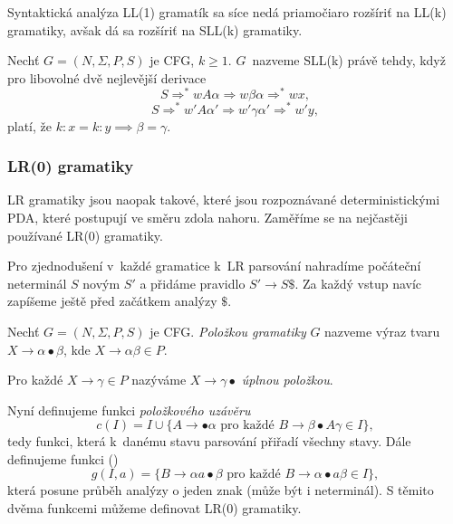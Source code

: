 Syntaktická analýza LL(1) gramatík sa síce nedá priamočiaro
rozšíriť na LL(k) gramatiky, avšak dá sa rozšíriť na SLL(k) gramatiky.

\begin{definition}
    Nechť $G = (N, \Sigma, P, S)$ je CFG, $k \geq 1$. $G$~nazveme SLL(k)
    právě tehdy, když pro libovolné dvě nejlevější derivace
	\[
		S \Rightarrow^* wA\alpha \Rightarrow w\beta\alpha \Rightarrow^* wx,
	\]
    \[ 
		S \Rightarrow^* w'A\alpha' \Rightarrow w'\gamma\alpha' \Rightarrow^* w'y,
	\]
    platí, že $k : x = k : y \implies \beta = \gamma$.
\end{definition}

\subsubsection{LR(0) gramatiky}


LR gramatiky jsou naopak takové, které jsou rozpoznávané deterministickými PDA,
které postupují ve směru zdola nahoru. Zaměříme se na nejčastěji
používané LR(0) gramatiky.

Pro zjednodušení v~každé gramatice k~LR parsování nahradíme počáteční
neterminál $S$ novým $S'$ a přidáme pravidlo $S' \to S\$$. Za každý
vstup navíc zapíšeme ještě před začátkem analýzy $\$$.

\begin{definition}
    Nechť $G = (N, \Sigma, P, S)$ je CFG.
    {\em Položkou gramatiky} $G$ nazveme výraz tvaru
    $X \to \alpha \bullet \beta$, kde $X \to \alpha \beta \in P$.

    Pro každé $X \to \gamma \in P$ nazýváme $X \to \gamma \bullet$
    {\em úplnou položkou}.
\end{definition}

Nyní definujeme funkci {\em položkového uzávěru}
\[
    c(I) = I \cup
    \{ A \to \bullet \alpha \text{ pro každé } B \to \beta \bullet A \gamma \in I \},
\]
tedy funkci, která k~danému stavu parsování přiřadí všechny
 stavy. Dále definujeme funkci ()
\[
g(I, a) = \{ B \to \alpha a \bullet \beta \text{ pro každé }
    B \to \alpha \bullet a \beta \in I \},
\]
která posune průběh analýzy o jeden znak (může být i neterminál).
S těmito dvěma funkcemi můžeme definovat LR(0) gramatiky.

